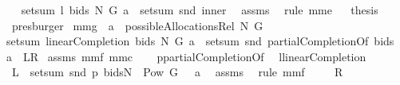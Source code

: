 \begin{isabellebody}
\ \isamarkupfalse%
\ {\isachardoublequoteopen}setsum\ {\isacharparenleft}{\isacharquery}l\ bids\ N\ G{\isacharparenright}\ a\ {\isacharequal}\ setsum\ snd\ {\isacharquery}inner{}{\isachardoublequoteclose}\ \isamarkupfalse%
\ assms\ \isamarkupfalse%
\ {\isacharparenleft}rule\ mm{}{}e{\isacharparenright}\isanewline
{}\isamarkupfalse%
\ \isamarkupfalse%
\ {\isacharquery}thesis\ \isamarkupfalse%
\ presburger\isanewline
{}\isamarkupfalse%
%
\endisatagproof
{\isafoldproof}%
%
\isadelimproof
\isanewline
%
\endisadelimproof
{}\isamarkupfalse%
\ mm{}{}g{\isacharcolon}\ \ {\isachardoublequoteopen}a\ {\isasymin}\ possibleAllocationsRel\ N\ G{\isachardoublequoteclose}\ \ \isanewline
{\isachardoublequoteopen}setsum\ {\isacharparenleft}linearCompletion{\isacharprime}\ bids\ N\ G{\isacharparenright}\ a\ {\isacharequal}\ setsum\ snd\ {\isacharparenleft}{\isacharparenleft}partialCompletionOf\ bids{\isacharparenright}\ {\isacharbackquote}\ a{\isacharparenright}{\isachardoublequoteclose}\ {\isacharparenleft}\ {\isachardoublequoteopen}{\isacharquery}L{\isacharequal}{\isacharquery}R{\isachardoublequoteclose}{\isacharparenright}\isanewline
%
\isadelimproof
%
\endisadelimproof
%
\isatagproof
{}\isamarkupfalse%
\ assms\ mm{}{}f\ mm{}{}c\ \isanewline
{}\isamarkupfalse%
\ {\isacharminus}\isanewline
{}\isamarkupfalse%
\ {\isacharquery}p{\isacharequal}partialCompletionOf\ \isamarkupfalse%
\ {\isacharquery}l{\isacharequal}linearCompletion{\isacharprime}\isanewline
{}\isamarkupfalse%
\ {\isachardoublequoteopen}{\isacharquery}L\ {\isacharequal}\ setsum\ snd\ {\isacharparenleft}{\isacharparenleft}{\isacharquery}p\ bids{\isacharparenright}{\isacharbackquote}{\isacharparenleft}{\isacharparenleft}N\ {\isasymtimes}\ {\isacharparenleft}Pow\ G\ {\isacharminus}\ {\isacharbraceleft}{\isacharbraceleft}{\isacharbraceright}{\isacharbraceright}{\isacharparenright}{\isacharparenright}{\isasyminter}\ a{\isacharparenright}{\isacharparenright}{\isachardoublequoteclose}\ \isamarkupfalse%
\ assms\ \isamarkupfalse%
\ {\isacharparenleft}rule\ mm{}{}f{\isacharparenright}\isanewline
{}\isamarkupfalse%
\ \isamarkupfalse%
\ {\isachardoublequoteopen}{\isachardot}{\isachardot}{\isachardot}\ {\isacharequal}\ {\isacharquery}R{\isachardoublequoteclose}\ \isamarkupfalse%

\end{isabellebody}
